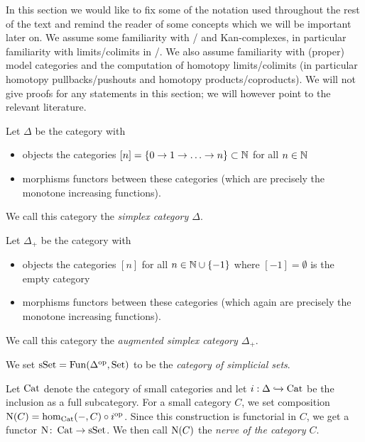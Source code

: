 In this section we would like to fix some of the notation used throughout the rest of the text and remind the reader of some concepts which we will be important later on.
We assume some familiarity with \inftycats/ and Kan-complexes, in particular familiarity with limits/colimits in \inftycats/.
We also assume familiarity with (proper) model categories and the computation of homotopy limits/colimits (in particular homotopy pullbacks/pushouts and homotopy products/coproducts).
We will not give proofs for any statements in this section; we will however point to the relevant literature.
\begin{definition}
    Let $\Delta$ be the category with
    \begin{itemize}
        \item objects the categories $[n]=\{0\to1\to\ldots\to n\}\subset\mathbb{N}$ for all $n\in\mathbb{N}$
        \item morphisms functors between these categories (which are precisely the monotone increasing functions).
    \end{itemize}
    We call this category the \emph{simplex category $\Delta$}.
\end{definition}
\begin{definition}
    Let $\Delta_+$ be the category with
    \begin{itemize}
        \item objects the categories $[n]$ for all $n\in\mathbb{N}\cup\left\lbrace-1\right\rbrace$ where $[-1]=\emptyset$ is the empty category
        \item morphisms functors between these categories (which again are precisely the monotone increasing functions).
    \end{itemize}
    We call this category the \emph{augmented simplex category $\Delta_+$}.
\end{definition}
\begin{definition}
    We set $\operatorname{sSet}=\operatorname{Fun}(\Delta^{\operatorname{op}},\operatorname{Set})$ to be the \emph{category of simplicial sets}.
\end{definition}
\begin{definition}
    Let $\operatorname{Cat}$ denote the category of small categories and let $i:\Delta\xhookrightarrow{}\operatorname{Cat}$ be the inclusion as a full subcategory.
    For a small category $C$, we set composition $\operatorname{N}(C)=\hom_{\operatorname{Cat}}(-,C)\circ i^{\operatorname{op}}$.
    Since this construction is functorial in $C$, we get a functor $\operatorname{N}\colon\operatorname{Cat}\to\operatorname{sSet}$. 
    We then call $\operatorname{N}(C)$ the \emph{nerve of the category $C$}.
\end{definition}
